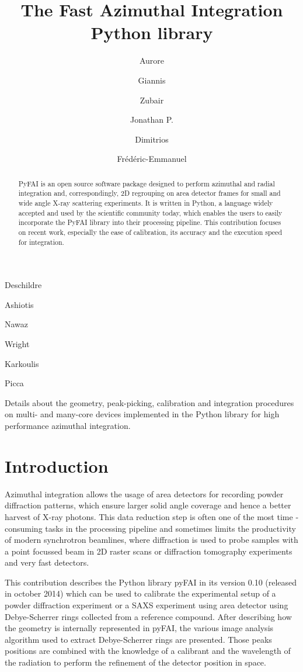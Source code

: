 \documentclass[preprint]{iucr}
\begin{document}
\title{The Fast Azimuthal Integration Python library}

    \author[a]{Aurore}{Deschildre}
    \author[a]{Giannis}{Ashiotis}
    \author[b]{Zubair}{Nawaz}
    \author[a]{Jonathan P.}{Wright}
    \author[a]{Dimitrios}{Karkoulis}
    \author[c]{Fr\'ed\'eric-Emmanuel}{Picca}

\maketitle

\begin{synopsis}
Details about the geometry, peak-picking, calibration and integration procedures
on multi- and many-core devices implemented in the Python library for high
performance azimuthal integration.
\end{synopsis}

\begin{abstract}
PyFAI is an open source software package designed to perform azimuthal and
radial integration and, correspondingly, 2D regrouping on area detector frames for small and wide
angle X-ray scattering experiments. 
It is written in Python, a language widely accepted and used by the scientific 
community today, which enables the users to easily incorporate the PyFAI 
library into their processing pipeline. 
This contribution focuses on recent work, especially the ease of
calibration, its accuracy and the execution speed for integration.
\end{abstract}

\section{Introduction}
Azimuthal integration allows the usage of area detectors for recording powder
diffraction patterns, which  ensure larger solid angle coverage and hence a
better harvest of X­-ray photons.
This data reduction step is often one of the most time ­consuming tasks in the
processing pipeline and sometimes limits the productivity of modern synchrotron
beamlines, where diffraction is used to probe samples with a point focussed
beam in 2D raster scans or diffraction tomography experiments and
very fast detectors.

This contribution describes the Python library pyFAI in its version 0.10
(released in october 2014) which can be used to calibrate the experimental
setup of a powder diffraction experiment or a SAXS experiment using area
detector using Debye-Scherrer rings collected from a reference compound. 
After describing how the geometry is internally represented in pyFAI, the
various image analysis algorithm used to extract Debye-Scherrer rings are presented.
Those peaks positions are combined with the knowledge of a calibrant and the
wavelength of the radiation to perform the refinement of the detector position
in space.
\end{document}
